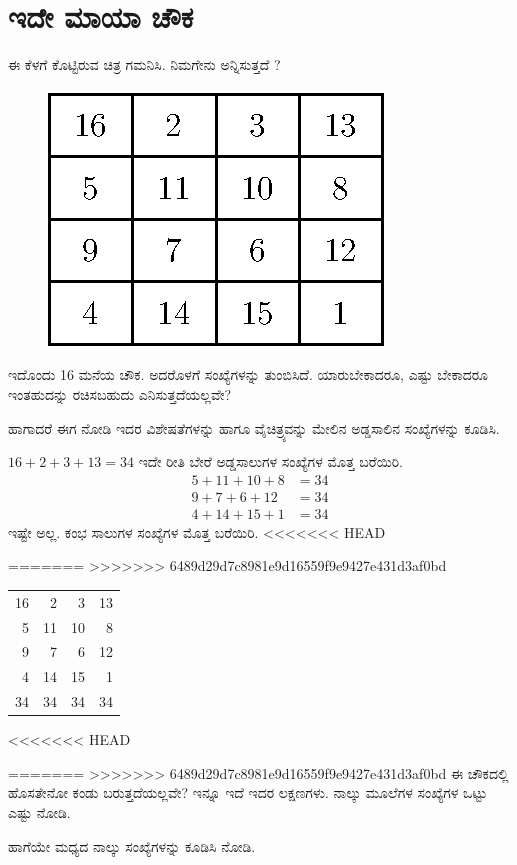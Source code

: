 \chapter{ಇದೇ ಮಾಯಾ ಚೌಕ}

ಈ ಕೆಳಗೆ ಕೊಟ್ಟಿರುವ ಚಿತ್ರ ಗಮನಿಸಿ. ನಿಮಗೇನು ಅನ್ನಿಸುತ್ತದೆ ?
\begin{figure}[H]
  \includegraphics{src/figures/chap1/fig1-1.eps}
\end{figure}
ಇದೊಂದು 16 ಮನೆಯ ಚೌಕ. ಅದರೊಳಗೆ ಸಂಖ್ಯೆಗಳನ್ನು ತುಂಬಿಸಿದೆ. ಯಾರು\break ಬೇಕಾದರೂ, ಎಷ್ಟು ಬೇಕಾದರೂ ಇಂತಹುದನ್ನು ರಚಿಸಬಹುದು ಎನಿಸುತ್ತದೆಯಲ್ಲವೇ?

ಹಾಗಾದರೆ ಈಗ ನೋಡಿ ಇದರ ವಿಶೇಷತೆಗಳನ್ನು ಹಾಗೂ ವೈಚಿತ್ರ್ಯವನ್ನು ಮೇಲಿನ ಅಡ್ಡಸಾಲಿನ ಸಂಖ್ಯೆಗಳನ್ನು ಕೂಡಿಸಿ.

$16+2+3+13=34$
ಇದೇ ರೀತಿ ಬೇರೆ ಅಡ್ಡಸಾಲುಗಳ ಸಂಖ್ಯೆಗಳ ಮೊತ್ತ ಬರೆಯಿರಿ.
\begin{align*}
5+11+10+8 & = 34\\
9+7+6+12 & = 34\\
4+14+15+1 & = 34
\end{align*}
ಇಷ್ಟೇ ಅಲ್ಲ. ಕಂಭ ಸಾಲುಗಳ ಸಂಖ್ಯೆಗಳ ಮೊತ್ತ ಬರೆಯಿರಿ.
<<<<<<< HEAD

=======
>>>>>>> 6489d29d7c8981e9d16559f9e9427e431d3af0bd
\begin{center}
\begin{tabular}{rrrr}
16 & 2 & 3 & 13 \\
5 & 11 & 10 & 8\\
9 & 7 & 6 & 12\\
4 & 14 & 15 & 1\\
34 & 34 & 34 & 34 
\end{tabular}
\end{center}
<<<<<<< HEAD

=======
>>>>>>> 6489d29d7c8981e9d16559f9e9427e431d3af0bd
ಈ ಚೌಕದಲ್ಲಿ ಹೊಸತೇನೋ ಕಂಡು ಬರುತ್ತದೆಯಲ್ಲವೇ? ಇನ್ನೂ ಇದೆ ಇದರ ಲಕ್ಷಣಗಳು. ನಾಲ್ಕು ಮೂಲೆಗಳ ಸಂಖ್ಯೆಗಳ ಒಟ್ಟು ಎಷ್ಟು ನೋಡಿ.

ಹಾಗೆಯೇ ಮಧ್ಯದ ನಾಲ್ಕು ಸಂಖ್ಯೆಗಳನ್ನು ಕೂಡಿಸಿ ನೋಡಿ.

